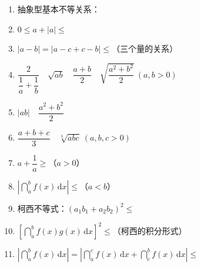 \documentclass[a4paper,12pt]{article}
\begin{document}
    \pagestyle{empty}

    \begin{minipage}[t]{0.30\textwidth}
        \begin{enumerate}[leftmargin=*, itemsep=1.1em]
            \item 抽象型基本不等关系：
            \item $0 \le a + |a| \le$
            \item $|a-b| = |a-c+c-b| \le$（三个量的关系）
            \item $\dfrac{2}{\dfrac{1}{a}+\dfrac{1}{b}} \quad \sqrt{ab} \quad \dfrac{a+b}{2} \quad \sqrt{\dfrac{a^2+b^2}{2}}\ (a,b>0)$
        \end{enumerate}
    \end{minipage}
    \hfill
    \begin{minipage}[t]{0.30\textwidth}
        \begin{enumerate}[leftmargin=*, itemsep=1.1em]
            \setcounter{enumi}{4}
            \item $|ab| \quad \dfrac{a^2+b^2}{2}$
            \item $\dfrac{a+b+c}{3} \quad \sqrt[3]{abc}\ (a,b,c>0)$
            \item $a + \dfrac{1}{a} \ge$（$a>0$）
            \item $\left|\dint_a^b f(x)\,\mathrm{d}x\right| \le$（$a<b$）
        \end{enumerate}
    \end{minipage}
    \hfill
    \begin{minipage}[t]{0.30\textwidth}
        \begin{enumerate}[leftmargin=*, itemsep=1.1em]
            \setcounter{enumi}{8}
            \item 柯西不等式：$(a_1b_1 + a_2b_2)^2 \le$
            \item $\left[\dint_a^b f(x)g(x)\,\mathrm{d}x\right]^2 \le$（柯西的积分形式）
            \item $\left|\dint_a^b f(x)\,\mathrm{d}x\right| = \left|\dint_a^c f(x)\,\mathrm{d}x + \dint_c^b f(x)\,\mathrm{d}x\right| \le$
        \end{enumerate}
    \end{minipage}
    \hfill

    \vspace{1em}
\end{document}
